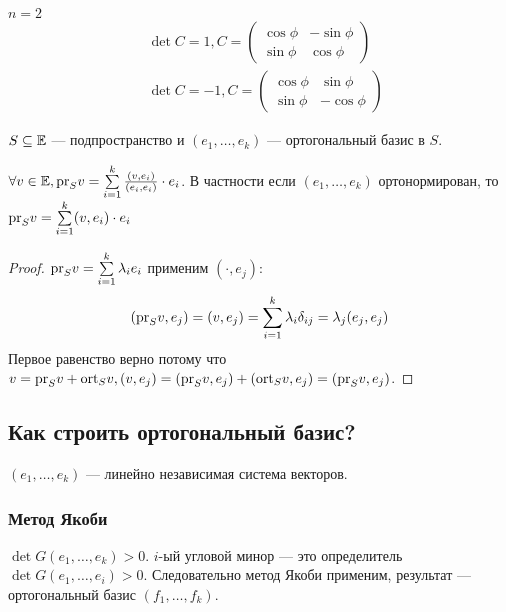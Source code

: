 \begin{Examples}
  $n = 2$
  \begin{align}
    &\det C = 1, C = \begin{pmatrix}
      \cos \phi & -\sin \phi \\
      \sin \phi & \cos \phi
    \end{pmatrix} \\[10pt]
    &\det C = -1, C = \begin{pmatrix}
      \cos \phi & \sin \phi \\
      \sin \phi & -\cos \phi
    \end{pmatrix}
  \end{align}
\end{Examples}

$S \subseteq \mathbb{E}$ --- подпространство и $(e_1, \ldots, e_k)$ --- ортогональный базис в $S$.

\begin{Suggestion}
 $\forall v \in \mathbb{E}, \mathrm{pr}_S v = \sum \limits_{i = 1}^{k} \frac{(v, e_i)}{(e_i, e_i)}\cdot e_i$. В частности если $(e_1, \ldots, e_k)$ ортонормирован, то $ \mathrm{pr}_S v = \sum \limits_{i = 1}^{k} (v, e_i)\cdot e_i$
\end{Suggestion}

\begin{proof}
  $\mathrm{pr}_S v = \sum \limits_{i = 1}^{k} \lambda_i e_i$ применим $(\cdot, e_j)$:
  \[
  (\mathrm{pr}_S v, e_j) = (v, e_j) = \sum \limits_{i = 1}^{k} \lambda_i \delta_{ij} = \lambda_j(e_j, e_j)
  \]
  Первое равенство верно потому что $v = \mathrm{pr}_S v + \mathrm{ort}_S v, (v, e_j) = (\mathrm{pr}_S v, e_j) + (\mathrm{ort}_S v, e_j) = (\mathrm{pr}_S v, e_j)$.
\end{proof}

\subsection*{Как строить ортогональный базис?}
%

$(e_1, \ldots, e_k)$ --- линейно независимая система векторов.

\subsubsection*{Метод Якоби}

$\det G(e_1, \ldots, e_k) > 0$. $i$-ый угловой минор --- это определитель $\det G(e_1, \ldots, e_i) > 0$. Следовательно метод Якоби применим, результат --- ортогональный базис $(f_1, \ldots, f_k)$.

